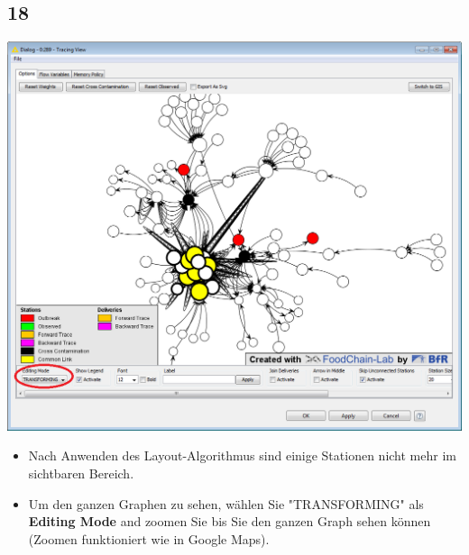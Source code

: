 \documentclass{beamer}
\begin{document}
\subsection{18}
\begin{frame}
	\begin{center}
  		\includegraphics[height=0.6\textheight]{18.png}
	\end{center}
	\begin{itemize}
		\item Nach Anwenden des Layout-Algorithmus sind einige Stationen nicht mehr im sichtbaren Bereich.
		\item Um den ganzen Graphen zu sehen, wählen Sie "TRANSFORMING" als \textbf{Editing Mode} and zoomen Sie bis Sie den ganzen Graph sehen können (Zoomen funktioniert wie in Google Maps).
	\end{itemize}
\end{frame}
\end{document}
